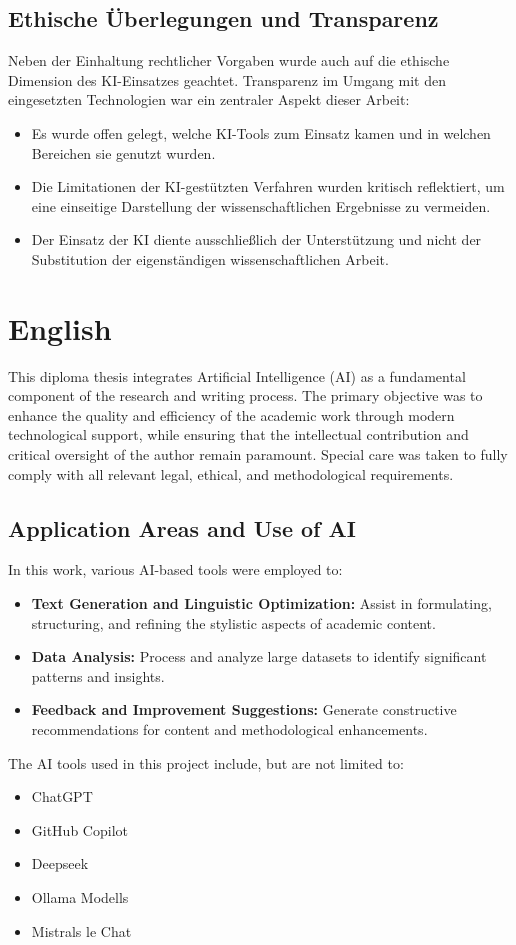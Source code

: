 \subsection*{Ethische Überlegungen und Transparenz}
Neben der Einhaltung rechtlicher Vorgaben wurde auch auf die ethische Dimension des KI-Einsatzes geachtet. Transparenz im Umgang mit den eingesetzten Technologien war ein zentraler Aspekt dieser Arbeit:
\begin{itemize}
    \item Es wurde offen gelegt, welche KI-Tools zum Einsatz kamen und in welchen Bereichen sie genutzt wurden.
    \item Die Limitationen der KI-gestützten Verfahren wurden kritisch reflektiert, um eine einseitige Darstellung der wissenschaftlichen Ergebnisse zu vermeiden.
    \item Der Einsatz der KI diente ausschließlich der Unterstützung und nicht der Substitution der eigenständigen wissenschaftlichen Arbeit.
\end{itemize}

\section*{English}
This diploma thesis integrates Artificial Intelligence (AI) as a fundamental component of the research and writing process. The primary objective was to enhance the quality and efficiency of the academic work through modern technological support, while ensuring that the intellectual contribution and critical oversight of the author remain paramount. Special care was taken to fully comply with all relevant legal, ethical, and methodological requirements.

\subsection*{Application Areas and Use of AI}
In this work, various AI-based tools were employed to:
\begin{itemize}
    \item \textbf{Text Generation and Linguistic Optimization:} Assist in formulating, structuring, and refining the stylistic aspects of academic content.
    \item \textbf{Data Analysis:} Process and analyze large datasets to identify significant patterns and insights.
    \item \textbf{Feedback and Improvement Suggestions:} Generate constructive recommendations for content and methodological enhancements.
\end{itemize}
The AI tools used in this project include, but are not limited to:
\begin{itemize}
    \item ChatGPT
    \item GitHub Copilot
    \item Deepseek
    \item Ollama Modells
    \item Mistrals le Chat
\end{itemize}

